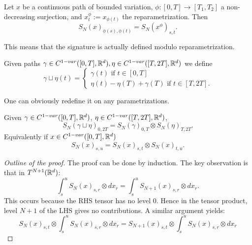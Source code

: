 \begin{proposition}
    Let \(x\) be a continuous path of bounded variation, \(\phi:[0,T] \rightarrow [T_1,T_2]\) a non-decreasing surjection, and \(x_t^\phi:=x_{\phi(t)}\) the reparametrization.
    Then
    \begin{equation}
        S_N(x)_{\phi(s),\phi(t)} = S_N(x^\phi)_{s,t}.
    \end{equation}
\end{proposition}

This means that the signature is actually defined modulo reparametrization.

\begin{definition}[Concatenation]
    Given paths \(\gamma \in C^{1-var}([0,T],\mathbb{R}^d), \eta \in C^{1-var}([T,2T],\mathbb{R}^d) \) we define
    \begin{equation}
        \gamma \sqcup \eta(t) =
        \begin{cases}
            \gamma(t) \text{ if } t \in [0,T] \\
            \eta(t) - \eta(T) + \gamma(T) \text{ if } t \in [T,2T].
        \end{cases}
    \end{equation}
\end{definition}

One can obviously redefine it on any parametrizations.

\begin{theorem}[Chen]
    Given \(\gamma \in C^{1-var}([0,T], \mathbb{R}^d)\), \(\eta \in C^{1-var}([T,2T], \mathbb{R}^d)\),
    \begin{equation}
        S_N(\gamma \sqcup \eta)_{0,2T} = S_N(\gamma)_{0,T} \otimes S_N(\eta)_{T,2T}.
    \end{equation}
    Equivalently if \(x \in C^{1-var}([0,T],\mathbb{R}^d)\)
    \begin{equation}
        S_N(x)_{s,u} = S_N(x)_{s,t} \otimes S_N(x)_{t,u}.
    \end{equation}
\end{theorem}
\begin{proof}[Outline of the proof]
    The proof can be done by induction.
    The key observation is that in \(T^{N+1}(\mathbb{R}^d)\):
    \begin{equation}
        \int_s^u S_N(x)_{s,r} \otimes dx_r = \int_s^u S_{N+1}(x)_{s,r} \otimes dx_r.
    \end{equation}
    This occurs because the RHS tensor has no level \(0\). Hence in the tensor product, level \(N+1\) of the LHS gives no contributions. A similar argument yields:
    \begin{equation}
        S_N(x)_{s,t} \otimes \int_s^u S_N(x)_{s,r} \otimes dx_r = S_{N+1}(x)_{s,t} \otimes \int_s^u S_N(x)_{s,r} \otimes dx_r 
    \end{equation}
\end{proof}

